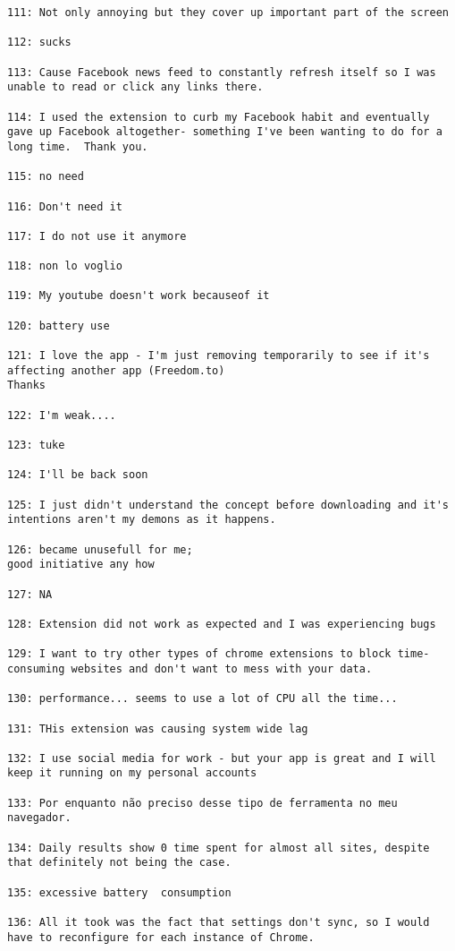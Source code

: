 \begin{lstlisting}[breaklines]
111: Not only annoying but they cover up important part of the screen

112: sucks

113: Cause Facebook news feed to constantly refresh itself so I was unable to read or click any links there.

114: I used the extension to curb my Facebook habit and eventually gave up Facebook altogether- something I've been wanting to do for a long time.  Thank you.

115: no need

116: Don't need it

117: I do not use it anymore

118: non lo voglio

119: My youtube doesn't work becauseof it

120: battery use

121: I love the app - I'm just removing temporarily to see if it's affecting another app (Freedom.to)
Thanks

122: I'm weak....

123: tuke

124: I'll be back soon

125: I just didn't understand the concept before downloading and it's intentions aren't my demons as it happens.

126: became unusefull for me;
good initiative any how

127: NA

128: Extension did not work as expected and I was experiencing bugs

129: I want to try other types of chrome extensions to block time-consuming websites and don't want to mess with your data.

130: performance... seems to use a lot of CPU all the time...

131: THis extension was causing system wide lag

132: I use social media for work - but your app is great and I will keep it running on my personal accounts

133: Por enquanto não preciso desse tipo de ferramenta no meu navegador.

134: Daily results show 0 time spent for almost all sites, despite that definitely not being the case.

135: excessive battery  consumption

136: All it took was the fact that settings don't sync, so I would have to reconfigure for each instance of Chrome.


\end{lstlisting}
